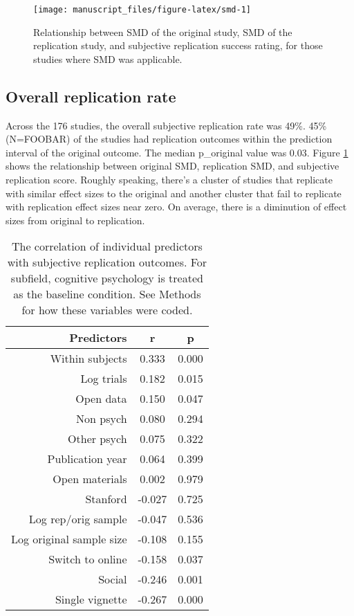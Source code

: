 \documentclass[
  english,
  a4paper,
]{article}
\begin{document}
\begin{figure}[ht]
\texttt{[image: manuscript\_files/figure-latex/smd-1]} \caption{Relationship between SMD of the original study, SMD of the replication study, and subjective replication success rating, for those studies where SMD was applicable.}\label{fig:smd}
\end{figure}

\hypertarget{overall-replication-rate}{%
\subsection{Overall replication rate}\label{overall-replication-rate}}

Across the 176 studies, the overall subjective replication rate was 49\%. 45\% (N=FOOBAR) of the studies had replication outcomes within the prediction interval of the original outcome. The median p\_original value was 0.03. Figure \ref{fig:smd} shows the relationship between original SMD, replication SMD, and subjective replication score. Roughly speaking, there's a cluster of studies that replicate with similar effect sizes to the original and another cluster that fail to replicate with replication effect sizes near zero. On average, there is a diminution of effect sizes from original to replication.

\begin{table}[!h]

\caption{\label{tab:cor}The correlation of individual predictors with subjective replication outcomes. For subfield, cognitive psychology is treated as the baseline condition. See Methods for how these variables were coded.}
\centering
\fontsize{10}{12}\selectfont
\begin{tabular}[t]{r|c|c}
\hline
Predictors & r & p\\
\hline
Within subjects & 0.333 & 0.000\\
\hline
Log trials & 0.182 & 0.015\\
\hline
Open data & 0.150 & 0.047\\
\hline
Non psych & 0.080 & 0.294\\
\hline
Other psych & 0.075 & 0.322\\
\hline
Publication year & 0.064 & 0.399\\
\hline
Open materials & 0.002 & 0.979\\
\hline
Stanford & -0.027 & 0.725\\
\hline
Log rep/orig sample & -0.047 & 0.536\\
\hline
Log original sample size & -0.108 & 0.155\\
\hline
Switch to online & -0.158 & 0.037\\
\hline
Social & -0.246 & 0.001\\
\hline
Single vignette & -0.267 & 0.000\\
\hline
\end{tabular}
\end{table}
\end{document}

